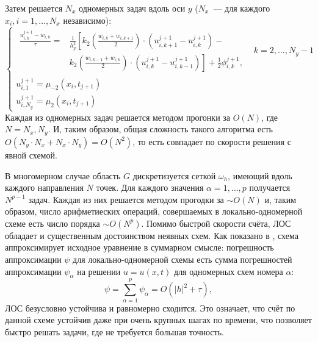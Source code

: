 Затем решается $N_x$ одномерных задач вдоль оси $y$ ($N_x$~--- для каждого $x_i, i = 1, \ldots, N_x$ независимо):
\begin{equation*}
    \begin{cases}
        \begin{aligned}
            \textstyle\frac{u_{i, k}^{j + 1} - w_{i, k}}{\tau} = &\textstyle \frac{1}{h_y^2} \left[ 
                k_2 \left( 
                    \frac{w_{i, k} + w_{i, k + 1}}{2}
                \right) \cdot \left( 
                    u_{i, k + 1}^{j + 1} - u_{i, k}^{j + 1}
                \right) -
            \right.\\
            &\textstyle \left.
                k_2 \left(
                    \frac{w_{i, k - 1} + w_{i, k}}{2}
                \right) \cdot \left( 
                    u_{i, k}^{j + 1} - u_{i, k - 1}^{j + 1}
                \right)
            \right] + \frac{1}{2}\phi_{i, k}^{j + 1}, 
        \end{aligned} & k = 2, \ldots, N_y - 1\\
        u_{i, 1}^{j + 1} = \mu_{-2}(x_i, t_{j + 1})\\
        u_{i, N_y}^{j + 1} = \mu_2(x_i, t_{j + 1})
    \end{cases}
\end{equation*}
Каждая из одномерных задач решается методом прогонки за $O(N)$, где $N = N_x, N_y$.
И, таким образом, общая сложность такого алгоритма есть $O(N_y \cdot N_x + N_x \cdot N_y) = O(N^2)$, то есть совпадает по скорости решения с явной схемой.

В многомерном случае область $G$ дискретизуется сеткой $\omega_h$, имеющий вдоль каждого направления $N$ точек.
Для каждого значения $\alpha = 1, \ldots, p$ получается $N^{p - 1}$ задач. 
Каждая из них решается методом прогодки за $\sim O(N)$ и, таким образом, число арифметиеских операций, совершаемых в локально-одномерной схеме есть число порядка $\sim O(N^p)$.
Помимо быстрой скорости счёта, ЛОС обладает и существенным достоинством неявных схем.
Как показано в \cite{СамарскийТеорияРазностныхСхем}, схема аппроксимирует исходное уравнение в суммарном смысле:
погрешность аппроксимации $\psi$ для локально-одномерной схемы есть сумма погрешностей аппроксимации $\psi_{\alpha}$ на решении $u = u(x, t)$ для одномерных схем номера $\alpha$:
\begin{equation*}
    \psi = \sum_{\alpha = 1}^{p} \psi_{\alpha} = O(|h|^2 + \tau),
\end{equation*}
ЛОС безусловно устойчива и равномерно сходится.
Это означает, что счёт по данной схеме устойчив даже при очень крупных шагах по времени, что позволяет быстро решать задачи, где не требуется большая точность.

